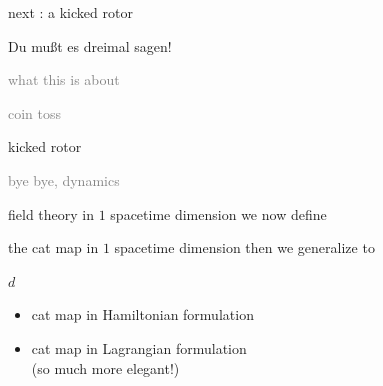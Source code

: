 \begin{frame}{next : a kicked rotor} %
\begin{bartlett}{
Du mu{\ss}t es dreimal sagen!
        }
\end{bartlett}
\vfill
\begin{enumerate}
              \item \textcolor{gray}{\small
{}
{what this is about}
              \item
{}
{coin toss}
                  }
              \item {\Large
{}
{kicked rotor}
                  }\textcolor{gray}{\small
              \item
{}
{\catlatt}
              \item
{}
{bye bye, dynamics}
                    }
            \end{enumerate}
\end{frame} %


\begin{frame}{field theory in $1$ spacetime dimension}
we now define

\bigskip

\begin{block}{the cat map in $1$ spacetime dimension}
then we generalize to

\bigskip

$d$\dmn\ {\Large \catlatt}
\end{block}

\vfill

\begin{itemize}
  \item cat map in Hamiltonian formulation
  \item cat map in Lagrangian formulation\\
    {\footnotesize (so much more elegant!)}
\end{itemize}
\end{frame} %

